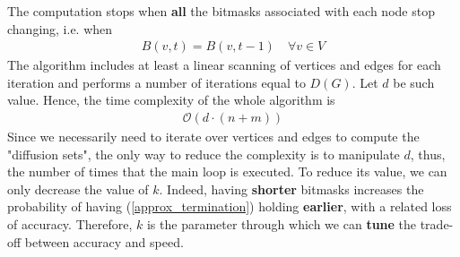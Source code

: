 \medskip
\noindent The computation stops when \textbf{all} the bitmasks associated with each node stop changing, i.e. when
\begin{align}
B(v,t) = B(v, t-1) \quad \forall v \in V \label{approx_termination}
\end{align}
The algorithm includes at least a linear scanning of vertices and edges for each iteration and performs a number of iterations equal to $D(G)$. Let $d$ be such value. Hence, the time complexity of the whole algorithm is
\begin{align*}
\mathcal{O}(d \cdot (n + m))
\end{align*}
Since we necessarily need to iterate over vertices and edges to compute the "diffusion sets", the only way to reduce the complexity is to manipulate $d$, thus, the number of times that the main loop is executed. To reduce its value, we can only decrease the value of $k$. Indeed, having \textbf{shorter} bitmasks increases the probability of having (\ref{approx_termination}) holding \textbf{earlier}, with a related loss of accuracy. Therefore, $k$ is the parameter through which we can \textbf{tune} the trade-off between accuracy and speed.
